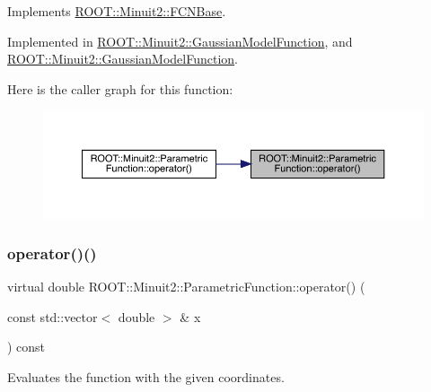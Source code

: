 Implements \mbox{\hyperlink{classROOT_1_1Minuit2_1_1FCNBase_ae4a86bd94d0d0f5ca6fc8f8ab2bb43cd}{R\+O\+O\+T\+::\+Minuit2\+::\+F\+C\+N\+Base}}.



Implemented in \mbox{\hyperlink{classROOT_1_1Minuit2_1_1GaussianModelFunction_af4102c5eecd496d63c5592f7519248ce}{R\+O\+O\+T\+::\+Minuit2\+::\+Gaussian\+Model\+Function}}, and \mbox{\hyperlink{classROOT_1_1Minuit2_1_1GaussianModelFunction_af4102c5eecd496d63c5592f7519248ce}{R\+O\+O\+T\+::\+Minuit2\+::\+Gaussian\+Model\+Function}}.

Here is the caller graph for this function\+:
\nopagebreak
\begin{figure}[H]
\begin{center}
\leavevmode
\includegraphics[width=350pt]{d3/d76/classROOT_1_1Minuit2_1_1ParametricFunction_a953426fa51c84cdef3eba24274131806_icgraph}
\end{center}
\end{figure}
\mbox{\label{classROOT_1_1Minuit2_1_1ParametricFunction_a953426fa51c84cdef3eba24274131806}} 
\subsubsection{\texorpdfstring{operator()()}{operator()()}\hspace{0.1cm}{\footnotesize\ttfamily [3/6]}}
{\footnotesize\ttfamily virtual double R\+O\+O\+T\+::\+Minuit2\+::\+Parametric\+Function\+::operator() (\begin{DoxyParamCaption}\item[{const std\+::vector$<$ double $>$ \&}]{x }\end{DoxyParamCaption}) const\hspace{0.3cm}{\ttfamily [pure virtual]}}

Evaluates the function with the given coordinates.


